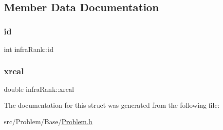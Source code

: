 \subsection{Member Data Documentation}
\mbox{\label{structinfraRank_ace3640f7fdc691b68111cf07e0eabaae}} 
\subsubsection{\texorpdfstring{id}{id}}
{\footnotesize\ttfamily int infra\+Rank\+::id}

\mbox{\label{structinfraRank_a1bb966369809456d65bd4e2d4e19d775}} 
\subsubsection{\texorpdfstring{xreal}{xreal}}
{\footnotesize\ttfamily double infra\+Rank\+::xreal}



The documentation for this struct was generated from the following file\+:\begin{DoxyCompactItemize}
\item 
src/\+Problem/\+Base/\mbox{\hyperlink{Problem_8h}{Problem.\+h}}\end{DoxyCompactItemize}
